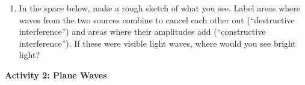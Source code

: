 \begin{enumerate}[resume]

\item In the space below, make a rough sketch of what you see.  Label areas where waves from the two sources combine to cancel each other out (``destructive interference'') and areas where their amplitudes add (``constructive interference'').  If these were visible light waves, where would you see bright light?
\vfill

\end{enumerate}

\textbf{Activity 2: Plane Waves}


